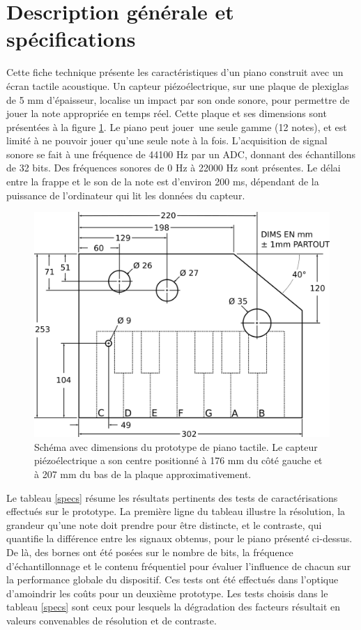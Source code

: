 ﻿\documentclass[11pt,letterpaper]{article}
\begin{document}

\section{Description générale et spécifications}

Cette fiche technique présente les caractéristiques d'un piano construit avec un
écran tactile acoustique. Un capteur piézoélectrique, sur une plaque de plexiglas 
de 5 mm d'épaisseur, localise un impact par son onde sonore, pour permettre 
de jouer la note appropriée en temps réel. Cette plaque 
et ses dimensions sont présentées à la figure \ref{piano_fig}. Le piano peut jouer\
une seule gamme (12 notes), et est limité à ne pouvoir jouer qu'une seule note à 
la fois. L'acquisition de signal sonore se fait à une fréquence de 44100 Hz par un
ADC, donnant des échantillons de 32 bits. Des fréquences sonores de 0 Hz à 22000 Hz sont présentes. Le délai entre la frappe
et le son de la note est d'environ 200 ms,
dépendant de la puissance de l'ordinateur qui lit les données du capteur. 
 \begin{figure}[H]
   \centering
   \includegraphics[scale=0.25]{schema.png}
   \caption{Schéma avec dimensions du prototype de piano tactile. Le capteur
   piézoélectrique a son centre positionné à 176 mm du côté gauche et à 207 mm
   du bas de la plaque approximativement.}
   \label{piano_fig}
 \end{figure}

Le tableau \ref{specs} résume les résultats pertinents des tests de caractérisations
effectués sur le prototype. La première ligne du tableau illustre la résolution, la grandeur qu'une note doit prendre pour être distincte, et le 
contraste, qui quantifie la différence entre les signaux obtenus, pour le piano présenté ci-dessus. De là, des bornes ont été posées sur le nombre de bits, la fréquence d'échantillonnage et le contenu fréquentiel
pour évaluer l'influence de chacun sur la performance globale du dispositif. Ces tests ont été effectués dans l'optique d'amoindrir
les coûts pour un deuxième prototype. Les tests choisis dans le tableau \ref{specs} sont ceux pour lesquels la dégradation 
des facteurs résultait en valeurs convenables de résolution et de contraste.
\end{document}
